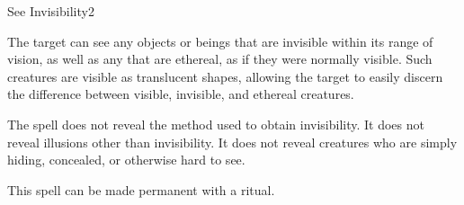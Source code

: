 \begin{spellsection}{See Invisibility}{2}
\begin{spellheader}
    \begin{spelltargetinginfo}
    \end{spelltargetinginfo}
\end{spellheader}
\begin{spellcontent}
    \begin{spelleffects}
        \spelleffect The target can see any objects or beings that are invisible within its range of vision, as well as any that are ethereal, as if they were normally visible. Such creatures are visible as translucent shapes, allowing the target to easily discern the difference between visible, invisible, and ethereal creatures.
        \spelldur \durlong \dismissable
    \end{spelleffects}
\end{spellcontent}
\begin{spellfooter}
    \spellnotes The spell does not reveal the method used to obtain invisibility. It does not reveal illusions other than invisibility. It does not reveal creatures who are simply hiding, concealed, or otherwise hard to see.

    This spell can be made permanent with a  ritual.
\end{spellfooter}
\end{spellsection}

